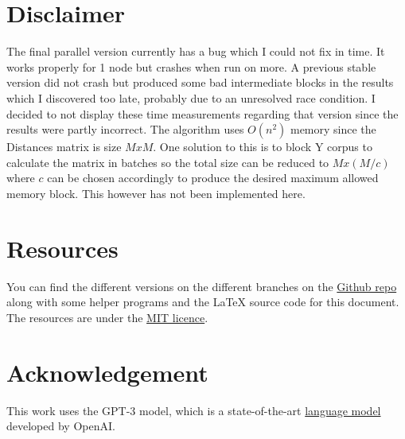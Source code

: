 \documentclass[12pt, letterpaper]{article}
\begin{document}
\section{Disclaimer}
The final parallel version currently has a bug which I could not fix in time. It works properly for 1 node but crashes when run on more. A previous stable version did not crash but produced some bad intermediate blocks in the results which I discovered too late, probably due to an unresolved race condition. I decided to not display these time measurements regarding that version since the results were partly incorrect.
The algorithm uses $O(n^2)$ memory since the Distances matrix is size $M x M$. 
One solution to this is to block Y corpus to calculate the matrix in batches so the total size can be reduced to $M x (M/c)$ where $c$ can be chosen accordingly to produce the desired maximum allowed memory block. 
This however has not been implemented here.

\section{Resources}
You can find the different versions on the different branches on the \href{https://github.com/charisvt/PDS-KNN}{Github repo} along with some helper programs and the LaTeX source code for this document.
The resources are under the \href{https://www.mit.edu/~amini/LICENSE.mdMIT}{MIT licence}.

\section{Acknowledgement}
This work uses the GPT-3 model, which is a state-of-the-art \href{https://chat.openai.com/chat}{language model} developed by OpenAI.
\end{document}
